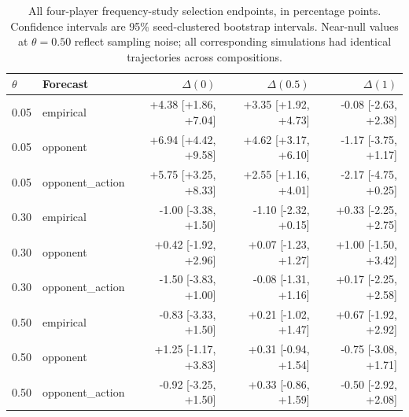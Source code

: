 \begin{table}[htbp]\centering\scriptsize
\caption{All four-player frequency-study selection endpoints, in percentage points. Confidence intervals are 95\% seed-clustered bootstrap intervals. Near-null values at $\theta=0.50$ reflect sampling noise; all corresponding simulations had identical trajectories across compositions.}
\label{tab:s1}
\begin{tabular}{llrrr}\toprule
$\theta$ & Forecast & $\Delta(0)$ & $\Delta(0.5)$ & $\Delta(1)$ \\ \midrule
0.05 & empirical & +4.38 [+1.86, +7.04] & +3.35 [+1.92, +4.73] & -0.08 [-2.63, +2.38] \\
0.05 & opponent & +6.94 [+4.42, +9.58] & +4.62 [+3.17, +6.10] & -1.17 [-3.75, +1.17] \\
0.05 & opponent\_action & +5.75 [+3.25, +8.33] & +2.55 [+1.16, +4.01] & -2.17 [-4.75, +0.25] \\
0.30 & empirical & -1.00 [-3.38, +1.50] & -1.10 [-2.32, +0.15] & +0.33 [-2.25, +2.75] \\
0.30 & opponent & +0.42 [-1.92, +2.96] & +0.07 [-1.23, +1.27] & +1.00 [-1.50, +3.42] \\
0.30 & opponent\_action & -1.50 [-3.83, +1.00] & -0.08 [-1.31, +1.16] & +0.17 [-2.25, +2.58] \\
0.50 & empirical & -0.83 [-3.33, +1.50] & +0.21 [-1.02, +1.47] & +0.67 [-1.92, +2.92] \\
0.50 & opponent & +1.25 [-1.17, +3.83] & +0.31 [-0.94, +1.54] & -0.75 [-3.08, +1.71] \\
0.50 & opponent\_action & -0.92 [-3.25, +1.50] & +0.33 [-0.86, +1.59] & -0.50 [-2.92, +2.08] \\
\bottomrule\end{tabular}\end{table}
